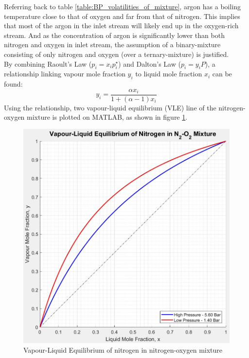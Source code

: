         \noindent Referring back to table \ref{table:BP_volatilities_of_mixture}, argon has a boiling temperature close to that of oxygen and far from that of nitrogen. This implies that most of the argon in the inlet stream will likely end up in the oxygen-rich stream. And as the concentration of argon is significantly lower than both nitrogen and oxygen in inlet stream, the assumption of a binary-mixture consisting of only nitrogen and oxygen (over a ternary-mixture) is justified. \\
        By combining Raoult's Law ($p_i = x_ip_i^\star$) and Dalton's Law ($p_i=y_iP$), a relationship linking vapour mole fraction $y_i$ to liquid mole fraction $x_i$ can be found: 
        \begin{equation}
            y_i = \frac{\alpha x_i}{1+(\alpha-1)x_i}
            \label{eq:volatility}
        \end{equation}
        Using the relationship, two vapour-liquid equilibrium (VLE) line of the nitrogen-oxygen mixture is plotted on MATLAB, as shown in figure \ref{VLEdata}. \\
        \begin{figure}[ht]
            \centering
	        \includegraphics[scale=0.5]{VLEdata.jpg}
	        \caption{Vapour-Liquid Equilibrium of nitrogen in nitrogen-oxygen mixture}
	        \label{VLEdata}
        \end{figure}
        
